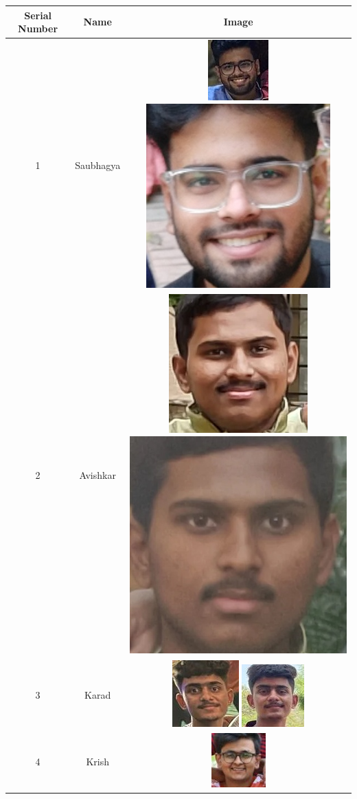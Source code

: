 \documentclass[openany]{report}
\begin{document}
\begin{table}[H]
    \centering
    \begin{tabular}{|c|c|c|}
        \hline
        \textbf{Serial Number} & \textbf{Name} & \textbf{Image}                                        \\
        \hline
        1                      & Saubhagya     & \includegraphics[height=.15\textwidth]{../imgs/saubhagya (2).jpg}
        \includegraphics[height=.15\textwidth]{../imgs/saubhagya (28).jpg}
        \\
        \hline
        2                      & Avishkar      & \includegraphics[height=.15\textwidth]{../imgs/avishkar (1).jpg}
        \includegraphics[height=.15\textwidth]{../imgs/avishkar (8).jpg}
        \\
        \hline
        3                      & Karad         & \includegraphics[height=.15\textwidth]{../imgs/sourab.jpg}
        \includegraphics[height=.15\textwidth]{../imgs/sourab (12).jpg}
        \\
        \hline
        4                      & Krish         & \includegraphics[height=.15\textwidth]{../imgs/krish (4).jpg}

\end{tabular}
\end{table}
\end{document}
